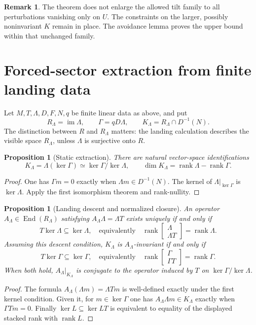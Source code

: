 \documentclass[11pt]{amsart}
\newtheorem{proposition}[theorem]{Proposition}
\theoremstyle{definition}
\newtheorem{remark}[theorem]{Remark}
\newcommand{\im}{\operatorname{im}}
\newcommand{\End}{\operatorname{End}}
\newcommand{\rankp}{\operatorname{rank}}
\begin{document}
\begin{remark}
The theorem does not enlarge the allowed tilt family to all perturbations
vanishing only on \(U\). The constraints on the larger, possibly noninvariant
\(K\) remain in place. The avoidance lemma proves the upper bound within that
unchanged family.
\end{remark}

\section{Forced-sector extraction from finite landing data}

Let \(M,T,\Lambda,D,F,N,q\) be finite linear data as above, and put
\[
R_\Lambda=\im\Lambda,\qquad
\Gamma=qD\Lambda,\qquad
K_\Lambda=R_\Lambda\cap D^{-1}(N).
\]
The distinction between \(R\) and \(R_\Lambda\) matters: the landing calculation
describes the visible space \(R_\Lambda\), unless \(\Lambda\) is surjective onto \(R\).

\begin{proposition}[Static extraction]\label{prop:static}
There are natural vector-space identifications
\begin{equation}
K_\Lambda=\Lambda(\ker\Gamma)
 \simeq\ker\Gamma/\ker\Lambda,\qquad
\dim K_\Lambda=\rankp\Lambda-\rankp\Gamma.
\label{eq:quotient}
\end{equation}
\end{proposition}
\begin{proof}
One has \(\Gamma m=0\) exactly when \(\Lambda m\in D^{-1}(N)\).
The kernel of \(\Lambda|_{\ker\Gamma}\) is \(\ker\Lambda\).
Apply the first isomorphism theorem and rank-nullity.
\end{proof}

\begin{proposition}[Landing descent and normalized closure]\label{prop:closure}
An operator \(A_\Lambda\in\End(R_\Lambda)\) satisfying
\(A_\Lambda\Lambda=\Lambda T\) exists uniquely if and only if
\[
T\ker\Lambda\subseteq\ker\Lambda,
\quad\text{equivalently}\quad
\rankp\begin{bmatrix}\Lambda\\\Lambda T\end{bmatrix}=\rankp\Lambda.
\]
Assuming this descent condition, \(K_\Lambda\) is \(A_\Lambda\)-invariant if and only if
\[
T\ker\Gamma\subseteq\ker\Gamma,
\quad\text{equivalently}\quad
\rankp\begin{bmatrix}\Gamma\\\Gamma T\end{bmatrix}=\rankp\Gamma.
\]
When both hold, \(A_\Lambda|_{K_\Lambda}\) is conjugate to the operator induced by \(T\)
on \(\ker\Gamma/\ker\Lambda\).
\end{proposition}
\begin{proof}
The formula \(A_\Lambda(\Lambda m)=\Lambda Tm\) is well-defined exactly under
the first kernel condition. Given it, for \(m\in\ker\Gamma\) one has
\(A_\Lambda\Lambda m\in K_\Lambda\) exactly when \(\Gamma Tm=0\).
Finally \(\ker L\subseteq\ker LT\) is equivalent to equality of the displayed
stacked rank with \(\rankp L\).
\end{proof}
\end{document}
